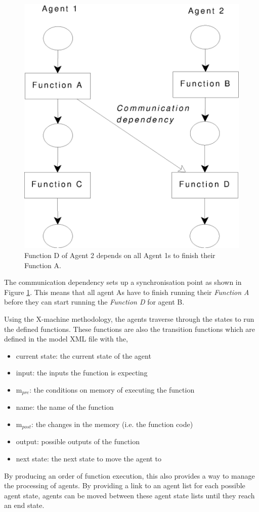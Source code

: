 \begin{figure}[!htb]
\begin{center}
  \includegraphics*[scale=0.4]{commdependency.eps}
  \caption{Function D of Agent 2 depends on all Agent 1s to finish their Function A.}
  \label{fig:commdependency}
  \end{center}
\end{figure}

The communication dependency sets up a synchronisation point as
shown in Figure \ref{fig:commdependency}. This means that all agent
As have to finish running their \emph{Function A} before they can
start running the \emph{Function D} for agent B.

Using the X-machine methodology, the agents traverse through the
states to run the defined functions. These functions are also the
transition functions which are defined in the model XML file with
the,

\begin{itemize}
\item current state: the current state of the agent
\item input: the inputs the function is expecting
\item m$_{pre}$: the conditions on memory of executing the function
\item name: the name of the function
\item m$_{post}$: the changes in the memory (i.e. the function code)
\item output: possible outputs of the function
\item next state: the next state to move the agent to
\end{itemize}

By producing an order of function execution, this also provides a way to manage the processing of agents. By providing a link to an
agent list for each possible agent state, agents can be moved between these agent
state lists until they reach an end state.
